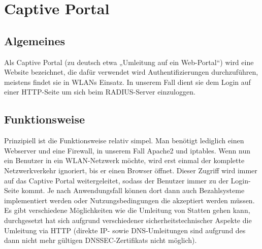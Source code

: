 \section{Captive Portal}

\subsection{Algemeines}
Als Captive Portal (zu deutsch etwa „Umleitung auf ein Web-Portal“) wird eine Website bezeichnet,
die dafür verwendet wird Authentifizierungen durchzuführen, meistens findet sie in WLANs
Einsatz. In unserem Fall dient sie dem Login auf einer HTTP-Seite um sich beim RADIUS-Server
einzuloggen. \cite{chilli0}

\subsection{Funktionsweise}
Prinzipiell ist die Funktionsweise relativ simpel. Man benötigt lediglich einen Webserver und eine
Firewall, in unserem Fall Apache2 und iptables. Wenn nun ein Benutzer in ein WLAN-Netzwerk
möchte, wird erst einmal der komplette Netzwerkverkehr ignoriert, bis er einen Browser öffnet.
Dieser Zugriff wird immer auf das Captive Portal weitergeleitet, sodass der Benutzer immer zu der
Login-Seite kommt. Je nach Anwendungsfall können dort dann auch Bezahlsysteme implementiert
werden oder Nutzungsbedingungen die akzeptiert werden müssen.\\
Es gibt verschiedene Möglichkeiten wie die Umleitung von Statten gehen kann, durchgesetzt hat
sich aufgrund verschiedener sicherheitstechnischer Aspekte die Umleitung via HTTP (direkte IP-
sowie DNS-Umleitungen sind aufgrund des dann nicht mehr gültigen DNSSEC-Zertifikats nicht
möglich). \cite{chilli1}
\newpage
